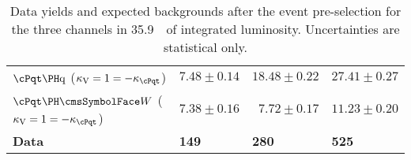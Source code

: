 \begin{table}[!h]
\begin{tabular}{lrrr}
  $\tHq$ ($\CV=1=-\Ct$)         & $  7.48 \pm 0.14$   & $ 18.48 \pm 0.22 $  & $ 27.41 \pm 0.27 $ \\
  $\tHW$ ($\CV=1=-\Ct$)         & $  7.38 \pm 0.16$   & $  7.72 \pm 0.17 $  & $ 11.23 \pm 0.20 $ \\ \hline
  {\bf Data}                    &\multicolumn{1}{l}{{\bf 149}}&\multicolumn{1}{l}{{\bf 280}} & \multicolumn{1}{l}{{\bf 525}} \\
        \hline
      \end{tabular}
      \caption{Data yields and expected backgrounds after the event pre-selection for the three channels in 35.9~\fbinv\ of integrated luminosity. Uncertainties are statistical only.\label{tab:yields}}
\end{table}

